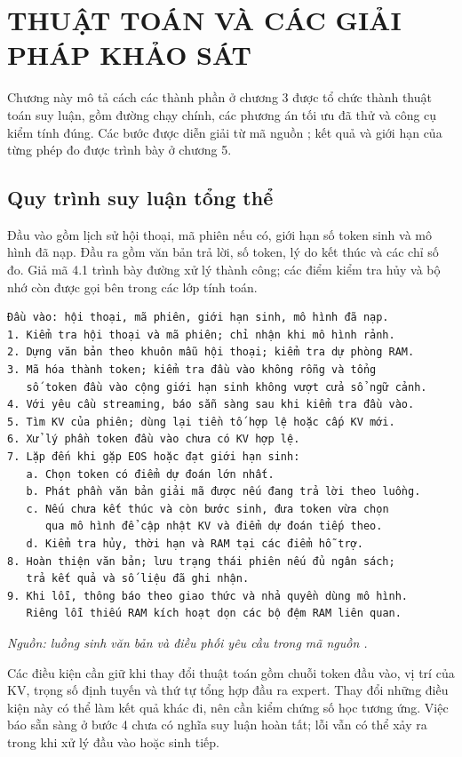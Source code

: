 \chapter{THUẬT TOÁN VÀ CÁC GIẢI PHÁP KHẢO SÁT}


Chương này mô tả cách các thành phần ở chương 3 được tổ chức thành thuật toán suy luận, gồm đường chạy chính, các phương án tối ưu đã thử và công cụ kiểm tính đúng. Các bước được diễn giải từ mã nguồn \cite{moe_tierengine_arch}; kết quả và giới hạn của từng phép đo được trình bày ở chương 5.

\section{Quy trình suy luận tổng thể}

Đầu vào gồm lịch sử hội thoại, mã phiên nếu có, giới hạn số token sinh và mô hình đã nạp. Đầu ra gồm văn bản trả lời, số token, lý do kết thúc và các chỉ số đo. Giả mã 4.1 trình bày đường xử lý thành công; các điểm kiểm tra hủy và bộ nhớ còn được gọi bên trong các lớp tính toán.

\begin{Verbatim}[samepage=true,breaklines=true,breakanywhere=true,fontsize=\small,frame=single,framesep=3mm]
Đầu vào: hội thoại, mã phiên, giới hạn sinh, mô hình đã nạp.
1. Kiểm tra hội thoại và mã phiên; chỉ nhận khi mô hình rảnh.
2. Dựng văn bản theo khuôn mẫu hội thoại; kiểm tra dự phòng RAM.
3. Mã hóa thành token; kiểm tra đầu vào không rỗng và tổng
   số token đầu vào cộng giới hạn sinh không vượt cửa sổ ngữ cảnh.
4. Với yêu cầu streaming, báo sẵn sàng sau khi kiểm tra đầu vào.
5. Tìm KV của phiên; dùng lại tiền tố hợp lệ hoặc cấp KV mới.
6. Xử lý phần token đầu vào chưa có KV hợp lệ.
7. Lặp đến khi gặp EOS hoặc đạt giới hạn sinh:
   a. Chọn token có điểm dự đoán lớn nhất.
   b. Phát phần văn bản giải mã được nếu đang trả lời theo luồng.
   c. Nếu chưa kết thúc và còn bước sinh, đưa token vừa chọn
      qua mô hình để cập nhật KV và điểm dự đoán tiếp theo.
   d. Kiểm tra hủy, thời hạn và RAM tại các điểm hỗ trợ.
8. Hoàn thiện văn bản; lưu trạng thái phiên nếu đủ ngân sách;
   trả kết quả và số liệu đã ghi nhận.
9. Khi lỗi, thông báo theo giao thức và nhả quyền dùng mô hình.
   Riêng lỗi thiếu RAM kích hoạt dọn các bộ đệm RAM liên quan.
\end{Verbatim}

\textit{Nguồn: luồng sinh văn bản và điều phối yêu cầu trong mã nguồn \cite{moe_tierengine_arch}.}

Các điều kiện cần giữ khi thay đổi thuật toán gồm chuỗi token đầu vào, vị trí của KV, trọng số định tuyến và thứ tự tổng hợp đầu ra expert. Thay đổi những điều kiện này có thể làm kết quả khác đi, nên cần kiểm chứng số học tương ứng. Việc báo sẵn sàng ở bước 4 chưa có nghĩa suy luận hoàn tất; lỗi vẫn có thể xảy ra trong khi xử lý đầu vào hoặc sinh tiếp.

